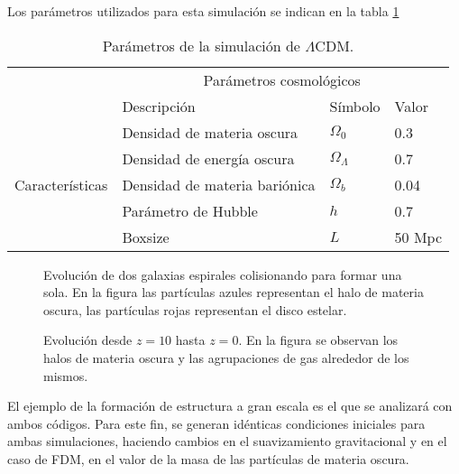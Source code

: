\documentclass[a4paper,openright,12pt]{book}
\begin{document}

Los parámetros utilizados para esta simulación se indican en la tabla \ref{tabla 3.1}
\begin{table}[htb]
\centering
\begin{tabular}{|l|l|l|l|}
\hline
& \multicolumn{3}{c|}{Parámetros cosmológicos} \\
\cline{2-4}
& Descripción & Símbolo & Valor\\
\hline \hline
\multirow{5}{3cm}{Características} & Densidad de materia oscura & $\Omega_{0}$ & 0.3\\ \cline{2-4}
& Densidad de energía oscura & $\Omega_{\Lambda} $ & 0.7\\ \cline{2-4}
& Densidad de materia bariónica & $\Omega_{b}$ & 0.04\\ \cline{2-4}
& Parámetro de Hubble & $h$ & 0.7 \\ \cline{2-4}
& Boxsize & $L$ & 50 Mpc\\ \cline{1-4}
\end{tabular}
\caption{Parámetros de la simulación de $\Lambda$CDM.}
\label{tabla 3.1}
\end{table}

\begin{figure}[htpb]
\centering
{}
\caption{\footnotesize{Evolución de dos galaxias espirales colisionando para formar una sola. En la figura las partículas azules representan el halo de materia oscura, las partículas rojas representan el disco estelar.}} \label{fig 3.3}
\end{figure}

\begin{figure}[htpb]
\centering
{}
\caption{\footnotesize{Evolución desde $z=10$ hasta $z = 0$. En la figura se observan los halos de materia oscura y las agrupaciones de gas alrededor de los mismos.}} \label{fig 3.5}
\end{figure}
El ejemplo de la formación de estructura a gran escala es el que se analizará con ambos códigos. Para este fin, se generan idénticas condiciones iniciales para ambas simulaciones, haciendo cambios en el suavizamiento gravitacional y en el caso de FDM, en el valor de la masa de las partículas de materia oscura.  
\end{document}
